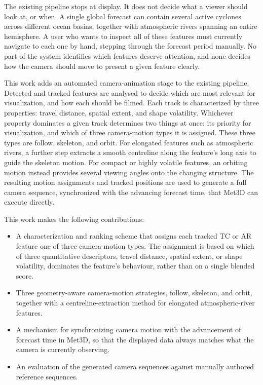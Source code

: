 \documentclass[journal abbreviation, manuscript]{copernicus}
\begin{document}
The existing pipeline stops at display. It does not decide what a viewer
should look at, or when. A single global forecast can contain several
active cyclones across different ocean basins, together with atmospheric
rivers spanning an entire hemisphere. A user who wants to inspect all of
these features must currently navigate to each one by hand, stepping
through the forecast period manually. No part of the system identifies
which features deserve attention, and none decides how the camera should
move to present a given feature clearly.

This work adds an automated camera-animation stage to the existing
pipeline. Detected and tracked features are analysed to decide which are
most relevant for visualization, and how each should be filmed. Each
track is characterized by three properties: travel distance, spatial
extent, and shape volatility. Whichever property dominates a given track
determines two things at once: its priority for visualization, and which
of three camera-motion types it is assigned. These three types are
follow, skeleton, and orbit. For elongated features such as atmospheric
rivers, a further step extracts a smooth centreline along the feature's
long axis to guide the skeleton motion. For compact or highly volatile
features, an orbiting motion instead provides several viewing angles onto
the changing structure. The resulting motion assignments and tracked
positions are used to generate a full camera sequence, synchronized with
the advancing forecast time, that Met3D can execute directly.

This work makes the following contributions:
\begin{itemize}
    \item A characterization and ranking scheme that assigns each
    tracked TC or AR feature one of three camera-motion types. The
    assignment is based on which of three quantitative descriptors,
    travel distance, spatial extent, or shape volatility, dominates the
    feature's behaviour, rather than on a single blended score.
    \item Three geometry-aware camera-motion strategies, follow,
    skeleton, and orbit, together with a centreline-extraction method
    for elongated atmospheric-river features.
    \item A mechanism for synchronizing camera motion with the
    advancement of forecast time in Met3D, so that the displayed data
    always matches what the camera is currently observing.
    \item An evaluation of the generated camera sequences against
    manually authored reference sequences.
\end{itemize}
\end{document}

